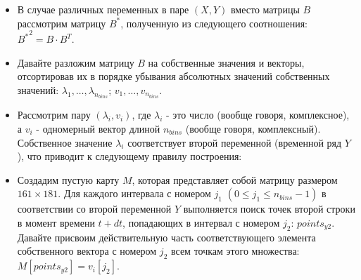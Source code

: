 \begin{itemize}
\begin{itemize}
		\item В случае различных переменных в паре $(X,Y)$ вместо матрицы $B$ рассмотрим матрицу $B^*$, полученную из следующего соотношения: ${B^*}^2= B \cdot B^T$.
		
		
		\item Давайте разложим матрицу $B$ на собственные значения и векторы, отсортировав их в порядке убывания абсолютных значений собственных значений: $\lambda_1,\dots,\lambda_{n_{bins}}$; $v_1,\dots,v_{n_{bins}}$.
		
		\item Рассмотрим пару $(\lambda_i, v_i)$, где $\lambda_i$ - это число (вообще говоря, комплексное), а $v_i$ - одномерный вектор длиной $n_{bins}$ (вообще говоря, комплексный). Собственное значение $\lambda_i$ соответствует второй переменной (временной ряд $Y$), что приводит к следующему правилу построения: 
		
		\item Создадим пустую карту $M$, которая представляет собой матрицу размером $161 \times 181$. Для каждого интервала с номером $j_1$ $(0 \leqslant j_1 \leqslant n_{bins}-1)$ в соответствии со второй переменной $Y$ выполняется поиск точек второй строки в момент времени $t+dt$, попадающих в интервал с номером $j_2$: $points_{y2}$. Давайте присвоим действительную часть соответствующего элемента собственного вектора с номером $j_2$ всем точкам этого множества: $M[points_{y2}] = v_i[j_2]$.
	\end{itemize}
\end{itemize}




